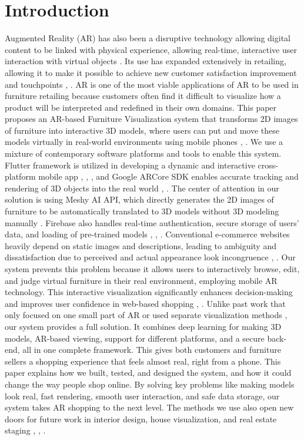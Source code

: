 \documentclass[conference]{IEEEtran}
\begin{document}
\section{Introduction}
Augmented Reality (AR) has also been a disruptive technology allowing digital content to be linked with physical experience, allowing real-time, interactive user interaction with virtual objects \cite{ref1}. Its use has expanded extensively in retailing, allowing it to make it possible to achieve new customer satisfaction improvement and touchpoints \cite{ref15}, \cite{ref16}. AR is one of the most viable applications of AR to be used in furniture retailing because customers often find it difficult to visualize how a product will be interpreted and redefined in their own domains. This paper proposes an AR-based Furniture Visualization system that transforms 2D images of furniture into interactive 3D models, where users can put and move these models virtually in real-world environments using mobile phones \cite{ref11}, \cite{ref12}. We use a mixture of contemporary software platforms and tools to enable this system. Flutter framework is utilized in developing a dynamic and interactive cross-platform mobile app \cite{ref3}, \cite{ref9}, \cite{ref17}, and Google ARCore SDK enables accurate tracking and rendering of 3D objects into the real world \cite{ref2}, \cite{ref7}. The center of attention in our solution is using Meshy AI API, which directly generates the 2D images of furniture to be automatically translated to 3D models without 3D modeling manually \cite{ref5}. Firebase also handles real-time authentication, secure storage of users' data, and loading of pre-trained models \cite{ref4}, \cite{ref18}, \cite{ref19}. Conventional e-commerce websites heavily depend on static images and descriptions, leading to ambiguity and dissatisfaction due to perceived and actual appearance look incongruence \cite{ref8}, \cite{ref11}. Our system prevents this problem because it allows users to interactively browse, edit, and judge virtual furniture in their real environment, employing mobile AR technology. This interactive visualization significantly enhances decision-making and improves user confidence in web-based shopping \cite{ref6}, \cite{ref14}. Unlike past work that only focused on one small part of AR or used separate visualization methods \cite{ref13}, our system provides a full solution. It combines deep learning for making 3D models, AR-based viewing, support for different platforms, and a secure back-end, all in one complete framework. This gives both customers and furniture sellers a shopping experience that feels almost real, right from a phone. This paper explains how we built, tested, and designed the system, and how it could change the way people shop online. By solving key problems like making models look real, fast rendering, smooth user interaction, and safe data storage, our system takes AR shopping to the next level. The methods we use also open new doors for future work in interior design, house visualization, and real estate staging \cite{ref6}, \cite{ref13}, \cite{ref20}.
\end{document}
